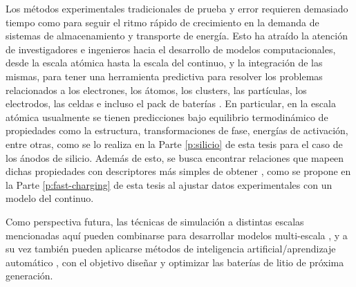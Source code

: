 Los métodos experimentales tradicionales de prueba y error requieren demasiado tiempo como 
para seguir el ritmo rápido de crecimiento en la demanda de sistemas de 
almacenamiento y transporte de energía.
Esto ha atraído la atención de investigadores e ingenieros 
hacia el desarrollo de modelos computacionales, desde la escala atómica hasta la 
escala del continuo, y la integración de las mismas, para tener una herramienta 
predictiva para resolver los problemas relacionados a los electrones, los átomos, 
los clusters, las partículas, los electrodos, las celdas e incluso el pack de 
baterías \cite{shi2016}. En particular, en la escala atómica usualmente se tienen
predicciones bajo equilibrio termodinámico de propiedades como la estructura, 
transformaciones de fase, energías de activación, entre otras, como se lo realiza
en la Parte \ref{p:silicio} de esta tesis para el caso de los ánodos de silicio. 
Además de esto, se busca encontrar relaciones que mapeen dichas propiedades con 
descriptores más simples de obtener \cite{juan2021}, como se propone en la Parte
\ref{p:fast-charging} de esta tesis al ajustar datos experimentales con un modelo
del continuo.

Como perspectiva futura, las técnicas de simulación a distintas escalas 
mencionadas aquí pueden combinarse para desarrollar modelos multi-escala 
\cite{franco2019}, y a su vez también pueden aplicarse métodos de inteligencia 
artificial/aprendizaje automático \cite{lombardo2021}, con el objetivo diseñar y 
optimizar las baterías de litio de próxima generación. 
